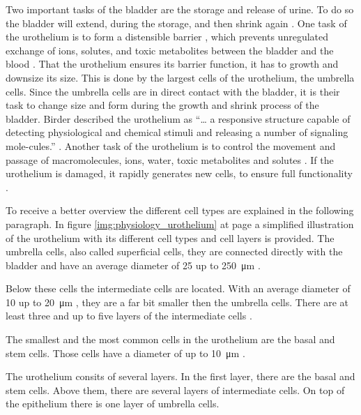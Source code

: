 Two important tasks of the bladder are the storage and release of urine. To do so the bladder will extend, during the storage, and then shrink again \cite{Karl-ErikAndersson2004}. One task of the urothelium is to form a distensible barrier \cite{Apodaca2004, Lazzeri2006, PuneetKhandelwal2009, Lewis2000, WRCross2005}, which prevents unregulated exchange of ions, solutes, and toxic metabolites between the bladder and the blood \cite{Apodaca2004, Lazzeri2006, PuneetKhandelwal2009, Lewis2000}. That the urothelium ensures its barrier function, it has to growth and downsize its size. This is done by the largest cells of the urothelium, the umbrella cells. Since the umbrella cells are in direct contact with the bladder, it is their task to change size and form during the growth and shrink process of the bladder. Birder described the urothelium as “… a responsive structure capable of detecting physiological and chemical stimuli and releasing a number of signaling mole-cules.” \cite{Birder2005}. Another task of the urothelium is to control the movement and passage of macromolecules, ions, water, toxic metabolites and solutes \cite{Apodaca2004, PuneetKhandelwal2009}. If the urothelium is damaged, it rapidly generates new cells, to ensure full functionality \cite{Apodaca2004, Yamany2014, PuneetKhandelwal2009}.

To receive a better overview the different cell types are explained in the following paragraph. In figure \ref{img:physiology_urothelium} at page \pageref{img:physiology_urothelium} a simplified illustration of the urothelium with its different cell types and cell layers is provided. \newline
The umbrella cells, also called superficial cells, they are connected directly with the bladder and have an average diameter of 25 up to \SI{250}{\micro\metre} \cite{Yamany2014, PuneetKhandelwal2009}. 

Below these cells the intermediate cells are located. With an average diameter of 10 up to \SI{20}{\micro\metre} \cite{Yamany2014, PuneetKhandelwal2009}, they are a far bit smaller then the umbrella cells. There are at least three and up to five layers of the intermediate cells \cite{REF}. 

The smallest and the most common cells in the urothelium are the basal and stem cells. Those cells have a diameter of up to \SI{10}{\micro\metre} \cite{Lazzeri2006, PuneetKhandelwal2009}. 

The urothelium consits of several layers. In the first layer, there are the basal and stem cells. Above them, there are several layers of intermediate cells. On top of the epithelium there is one layer of umbrella cells.


